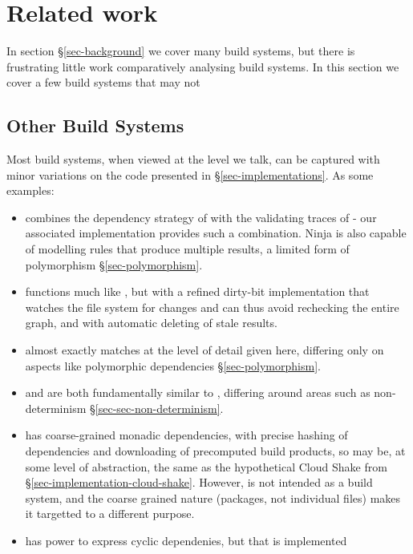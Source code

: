 \clearpage
\section{Related work}\label{sec-related}

In section \S\ref{sec-background} we cover many build systems, but there is frustrating little work comparatively analysing build systems. In this section we cover a few build systems that may not

\subsection{Other Build Systems}\label{sec-related-build}

Most build systems, when viewed at the level we talk, can be captured with minor variations on the code presented in \S\ref{sec-implementations}. As some examples:

\begin{itemize}
\item \Ninja \cite{ninja} combines the dependency strategy of \Make with the validating traces of \Shake - our associated implementation provides such a combination. Ninja is also capable of modelling rules that produce multiple results, a limited form of polymorphism \S\ref{sec-polymorphism}.
\item \Tup \cite{tup} functions much like \Make, but with a refined dirty-bit implementation that watches the file system for changes and can thus avoid rechecking the entire graph, and with automatic deleting of stale results.
\item \Redo \cite{redo} almost exactly matches \Shake at the level of detail given here, differing only on aspects like polymorphic dependencies \S\ref{sec-polymorphism}.
\item \Buck \cite{buck} and \CloudBuild \cite{cloudbuild} are both fundamentally similar to \Bazel, differing around areas such as non-determinism \S\ref{sec-sec-non-determinism}.
\item \Nix \cite{nix} has coarse-grained monadic dependencies, with precise hashing of dependencies and downloading of precomputed build products, so may be, at some level of abstraction, the same as the hypothetical Cloud Shake from \S\ref{sec-implementation-cloud-shake}. However, \Nix is not intended as a build system, and the coarse grained nature (packages, not individual files) makes it targetted to a different purpose. 
\item \Pluto \cite{pluto} has power to express cyclic dependenies, but that is implemented 
\end{itemize}

